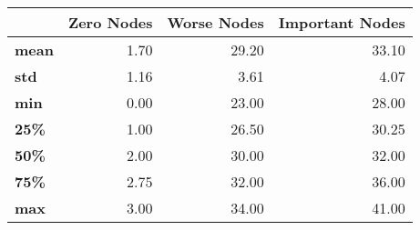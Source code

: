 \begin{tabular}{lrrr}
\toprule
{} &  Zero Nodes &  Worse Nodes &  Important Nodes \\
\midrule
\textbf{mean} &        1.70 &        29.20 &            33.10 \\
\textbf{std } &        1.16 &         3.61 &             4.07 \\
\textbf{min } &        0.00 &        23.00 &            28.00 \\
\textbf{25\% } &        1.00 &        26.50 &            30.25 \\
\textbf{50\% } &        2.00 &        30.00 &            32.00 \\
\textbf{75\% } &        2.75 &        32.00 &            36.00 \\
\textbf{max } &        3.00 &        34.00 &            41.00 \\
\bottomrule
\end{tabular}
